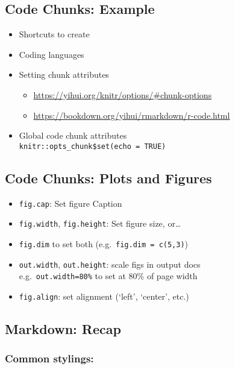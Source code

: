 \documentclass[
]{article}
\providecommand{\tightlist}{%
  \setlength{\itemsep}{0pt}\setlength{\parskip}{0pt}}
\begin{document}
\subsection{Code Chunks: Example}\label{code-chunks-example}

\begin{itemize}
\tightlist
\item
  Shortcuts to create
\item
  Coding languages
\item
  Setting chunk attributes

  \begin{itemize}
  \tightlist
  \item
    \url{https://yihui.org/knitr/options/\#chunk-options}
  \item
    \url{https://bookdown.org/yihui/rmarkdown/r-code.html}
  \end{itemize}
\item
  Global code chunk attributes\\
  \texttt{knitr::opts\_chunk\$set(echo\ =\ TRUE)}
\end{itemize}

\subsection{Code Chunks: Plots and
Figures}\label{code-chunks-plots-and-figures}

\begin{itemize}
\tightlist
\item
  \texttt{fig.cap}: Set figure Caption
\item
  \texttt{fig.width}, \texttt{fig.height}: Set figure size, or\ldots{}
\item
  \texttt{fig.dim} to set both (e.g.~\texttt{fig.dim\ =\ c(5,3)})
\item
  \texttt{out.width}, \texttt{out.height}: scale figs in output docs\\
  e.g.~\texttt{out.width=80\%} to set at 80\% of page width
\item
  \texttt{fig.align}: set alignment (`left', `center', etc.)
\end{itemize}

\subsection{Markdown: Recap}\label{markdown-recap}

\subsubsection{Common stylings:}\label{common-stylings}
\end{document}
